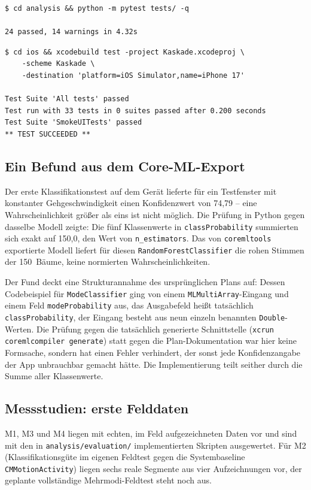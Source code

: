 \documentclass[11pt,a4paper,oneside]{article}
\begin{document}
\begin{lstlisting}
$ cd analysis && python -m pytest tests/ -q

24 passed, 14 warnings in 4.32s
\end{lstlisting}

\begin{lstlisting}
$ cd ios && xcodebuild test -project Kaskade.xcodeproj \
    -scheme Kaskade \
    -destination 'platform=iOS Simulator,name=iPhone 17'

Test Suite 'All tests' passed
Test run with 33 tests in 0 suites passed after 0.200 seconds
Test Suite 'SmokeUITests' passed
** TEST SUCCEEDED **
\end{lstlisting}

\subsection{Ein Befund aus dem Core-ML-Export}
\label{sec:befund-training}

Der erste Klassifikationstest auf dem Gerät lieferte für ein
Testfenster mit konstanter Gehgeschwindigkeit einen Konfidenzwert von
74{,}79 -- eine Wahrscheinlichkeit größer als eins ist nicht möglich. Die
Prüfung in Python gegen dasselbe Modell zeigte: Die fünf Klassenwerte in
\texttt{classProbability} summierten sich exakt auf 150{,}0, den Wert von
\texttt{n\_estimators}. Das von \texttt{coremltools} exportierte Modell
liefert für diesen \texttt{RandomForestClassifier} die rohen Stimmen der
150~Bäume, keine normierten Wahrscheinlichkeiten.

Der Fund deckt eine Strukturannahme des ursprünglichen Plans auf: Dessen
Codebeispiel für \texttt{ModeClassifier} ging von einem
\texttt{MLMultiArray}-Eingang und einem Feld \texttt{modeProbability} aus,
das Ausgabefeld heißt tatsächlich \texttt{classProbability}, der Eingang
besteht aus neun einzeln benannten \texttt{Double}-Werten. Die Prüfung
gegen die tatsächlich generierte Schnittstelle
(\texttt{xcrun coremlcompiler generate}) statt gegen die Plan-Dokumentation
war hier keine Formsache, sondern hat einen Fehler verhindert, der sonst
jede Konfidenzangabe der App unbrauchbar gemacht hätte. Die Implementierung
teilt seither durch die Summe aller Klassenwerte.

\subsection{Messstudien: erste Felddaten}
\label{sec:messstudien}

M1, M3 und M4 liegen mit echten, im Feld aufgezeichneten Daten vor und sind
mit den in \texttt{analysis/evaluation/} implementierten Skripten
ausgewertet. Für M2 (Klassifikationsgüte im eigenen Feldtest gegen die
Systembaseline \texttt{CMMotionActivity}) liegen sechs reale Segmente aus
vier Aufzeichnungen vor, der geplante vollständige Mehrmodi-Feldtest steht
noch aus.
\end{document}
